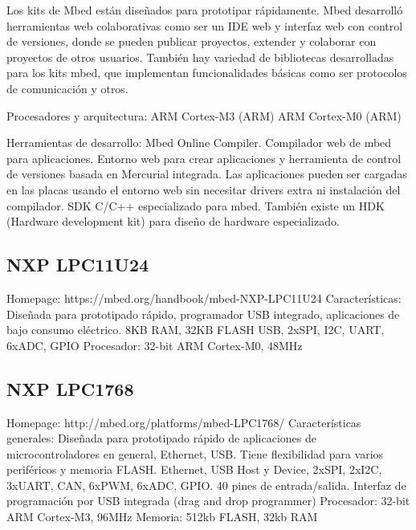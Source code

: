 
Los kits de Mbed están diseñados para prototipar rápidamente. Mbed desarrolló herramientas web colaborativas como ser un IDE web y interfaz web con control de versiones, donde se pueden publicar proyectos, extender y colaborar con proyectos de otros usuarios.
También hay variedad de bibliotecas desarrolladas para los kits mbed, que implementan funcionalidades básicas como ser protocolos de comunicación y otros.

Procesadores y arquitectura:
  ARM Cortex-M3 (ARM)
  ARM Cortex-M0 (ARM)

Herramientas de desarrollo:
  Mbed Online Compiler. Compilador web de mbed para aplicaciones. 
  Entorno web para crear aplicaciones y herramienta de control de versiones basada en Mercurial integrada. Las aplicaciones pueden ser cargadas en las placas usando el entorno web sin necesitar drivers extra ni instalación del compilador.
  SDK C/C++ especializado para mbed.
  También existe un HDK (Hardware development kit) para diseño de hardware especializado.

\subsection{NXP LPC11U24}

Homepage:
https://mbed.org/handbook/mbed-NXP-LPC11U24
Características:
Diseñada para prototipado rápido, programador USB integrado, aplicaciones de bajo consumo eléctrico.
8KB RAM, 32KB FLASH
USB, 2xSPI, I2C, UART, 6xADC, GPIO 
Procesador:
32-bit ARM Cortex-M0, 48MHz

\subsection{NXP LPC1768}
Homepage:
http://mbed.org/platforms/mbed-LPC1768/
Características generales:
Diseñada para prototipado rápido de aplicaciones de microcontroladores en general, Ethernet, USB.
Tiene flexibilidad para varios periféricos y memoria FLASH.
Ethernet, USB Host y Device, 2xSPI, 2xI2C, 3xUART, CAN, 6xPWM, 6xADC, GPIO.
40 pines de entrada/salida.
Interfaz de programación por USB integrada (drag and drop programmer)
Procesador:
32-bit ARM Cortex-M3, 96MHz
Memoria:
512kb FLASH, 32kb RAM


